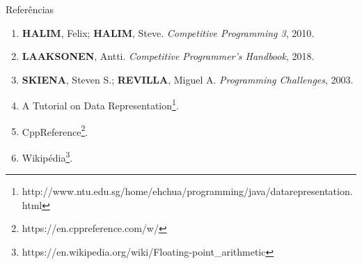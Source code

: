 \begin{frame}[fragile]{Referências}

    \begin{enumerate}
        \item \textbf{HALIM}, Felix; \textbf{HALIM}, Steve. \textit{Competitive Programming 3}, 2010.
        \item \textbf{LAAKSONEN}, Antti. \textit{Competitive Programmer's Handbook}, 2018.

        \item \textbf{SKIENA}, Steven S.; \textbf{REVILLA}, Miguel A. \textit{Programming
            Challenges}, 2003.

        \item A Tutorial on Data Representation{\footnote{http://www.ntu.edu.sg/home/ehchua/programming/java/datarepresentation.html}}.

        \item CppReference{\footnote{https://en.cppreference.com/w/}}.

        \item Wikipédia{\footnote{https://en.wikipedia.org/wiki/Floating-point\_arithmetic}}.

    \end{enumerate}

\end{frame}
